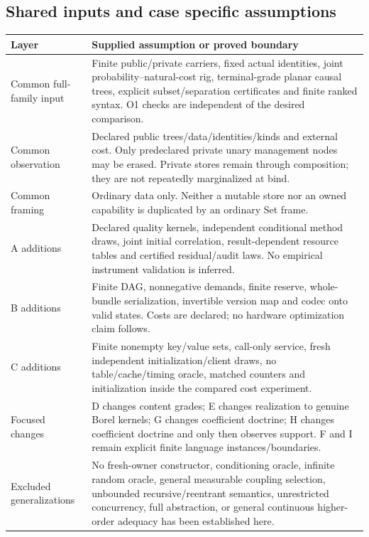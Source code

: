 \documentclass[11pt,a4paper]{article}
\theoremstyle{definition}
\begin{document}
\subsection{Shared inputs and case specific assumptions}
\begin{longtable}{@{}p{.28\linewidth}p{.61\linewidth}@{}}
\toprule Layer&Supplied assumption or proved boundary\\\midrule\endhead
Common full-family input&Finite public/private carriers, fixed actual
identities, joint probability--natural-cost rig, terminal-grade planar
causal trees, explicit subset/separation certificates and finite ranked
syntax. O1 checks are independent of the desired comparison.\\
Common observation&Declared public trees/data/identities/kinds and external
cost. Only predeclared private unary management nodes may be erased.
Private stores remain through composition; they are not repeatedly
marginalized at bind.\\
Common framing&Ordinary data only. Neither a mutable store nor an owned
capability is duplicated by an ordinary Set frame.\\
A additions&Declared quality kernels, independent conditional method draws,
joint initial correlation, result-dependent resource tables and certified
residual/audit laws. No empirical instrument validation is inferred.\\
B additions&Finite DAG, nonnegative demands, finite reserve, whole-bundle
serialization, invertible version map and codec onto valid states.
Costs are declared; no hardware optimization claim follows.\\
C additions&Finite nonempty key/value sets, call-only service, fresh
independent initialization/client draws, no table/cache/timing oracle,
matched counters and initialization inside the compared cost experiment.\\
Focused changes&D changes content grades; E changes realization to genuine
Borel kernels; G changes coefficient doctrine; H changes coefficient
doctrine and only then observes support. F and I remain explicit finite
language instances/boundaries.\\
Excluded generalizations&No fresh-owner constructor, conditioning oracle,
infinite random oracle, general measurable coupling selection, unbounded
recursive/reentrant semantics, unrestricted concurrency, full abstraction,
or general continuous higher-order adequacy has been established here.\\
\bottomrule
\end{longtable}
\end{document}
